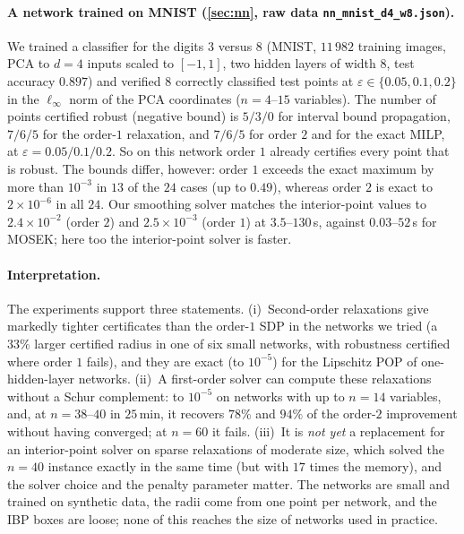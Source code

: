 \documentclass[a4paper,11pt]{article}
\theoremstyle{plain}
\theoremstyle{definition}
\theoremstyle{remark}
\begin{document}
\paragraph{A network trained on MNIST (\cref{sec:nn}, raw data \texttt{nn\_mnist\_d4\_w8.json}).} We trained a classifier for the digits $3$ versus $8$ (MNIST, $11\,982$ training images, PCA to $d=4$ inputs scaled to $[-1,1]$, two hidden layers of width $8$, test accuracy $0.897$) and verified $8$ correctly classified test points at $\varepsilon\in\{0.05,0.1,0.2\}$ in the $\ell_\infty$ norm of the PCA coordinates ($n=4$--$15$ variables). The number of points certified robust (negative bound) is $5/3/0$ for interval bound propagation, $7/6/5$ for the order-$1$ relaxation, and $7/6/5$ for order $2$ and for the exact MILP, at $\varepsilon=0.05/0.1/0.2$. So on this network order $1$ already certifies every point that is robust. The bounds differ, however: order $1$ exceeds the exact maximum by more than $10^{-3}$ in $13$ of the $24$ cases (up to $0.49$), whereas order $2$ is exact to $2\times10^{-6}$ in all $24$. Our smoothing solver matches the interior-point values to $2.4\times10^{-2}$ (order $2$) and $2.5\times10^{-3}$ (order $1$) at $3.5$--$130$\,s, against $0.03$--$52$\,s for MOSEK; here too the interior-point solver is faster.

\paragraph{Interpretation.} The experiments support three statements. (i)~Second-order relaxations give markedly tighter certificates than the order-$1$ SDP in the networks we tried (a $33\%$ larger certified radius in one of six small networks, with robustness certified where order $1$ fails), and they are exact (to $10^{-5}$) for the Lipschitz POP of one-hidden-layer networks. (ii)~A first-order solver can compute these relaxations without a Schur complement: to $10^{-5}$ on networks with up to $n=14$ variables, and, at $n=38$--$40$ in $25$\,min, it recovers $78\%$ and $94\%$ of the order-$2$ improvement without having converged; at $n=60$ it fails. (iii)~It is \emph{not yet} a replacement for an interior-point solver on sparse relaxations of moderate size, which solved the $n=40$ instance exactly in the same time (but with $17$ times the memory), and the solver choice and the penalty parameter matter. The networks are small and trained on synthetic data, the radii come from one point per network, and the IBP boxes are loose; none of this reaches the size of networks used in practice.
\end{document}
